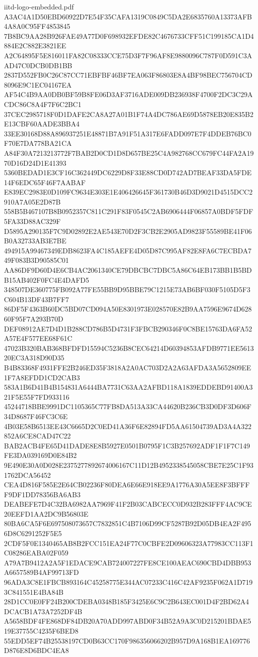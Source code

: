 \begin{filecontents*}[overwrite]{iitd-logo-embedded.pdf}
A3AC4A1D50EBD60922D7E54F35CAFA1319C0849C5DA2E6835760A13373AFB4A8A0C95FF4853845
7B8BC9AA28B926FAE49A77D0F698932EFDE82C4676733CFF51C199185CA1D4884E2C882E3821EE
A2C64895F5E816011FA82C08333CCE75D3F7F96AF8E9880096C787F0D591C3AAD47C0DCB0DB1BB
2837D552FB0C26C87CC71EBFBF46BF7EA063F86803E8A4BF98BEC756704CD8096E9C1EC04167EA
AF54C4B9AA0DB0BF59B8FE06D3AF3716ADE009DB236938F4700F2DC3C29ACDC86C8A4F7F6C2BC1
37CEC2985718F0D1DAFE2CA8A27A01B1F74A4DC786AE69D5878EB20E835B2E13CBF60AADE3BBA4
33EE30168D88A896937251E48871B7A91F51A317E6FADD097E7F4DDEB76BC0F70E7DA778BA21CA
A84F30A7213213772F7BAB2D0CD1D8D657BE25C4A982768CC679FC44FA2A1970D16D24D1E41393
5360BEDAD1E3CF16C362449DC6229D8F33E88CD0D742AD7BEAF33DA5FDE14F6EDC65F46F7AABAF
E839EC2983E0D109FC9634E303E1E406426645F361730B46D3D9021D4515DCC2910A7A05E2D87B
558B5B467107B8B0952357C811C291F83F0545C2AB6906444F06857A0BDF5FDF5FA33D88AC329F
D5895A290135F7C9D02892E2AE543E70D2F3CB2E2905AD9823F55589BE41F06B0A32733AB3E7BE
494915A99467349EDB8623FA4C185AEFE4D05D87C995AF82E8FA6C7ECBDA749F083B3D90585C01
AA86DF9D60D4E6CB4AC2061340CE79DBCBC7DBC5A86C64EB173BB1B5BDB15AB402F0FC4E4DAFD5
348507DE360775FB092A77FE55BB9D95BBE79C1215E73AB6BF030F5105D5F3C604B13DF43B7FF7
86DF5F4363B60DC5BD07CD094A50E8301973E028570E82B9AA7596E9674D62860F95F7A293B70D
DEF08912AE7D4D1B288CD786B5D4731F3FBCB290346F0C8BE15763DA6FA52A57E4F577EE68F61C
47023B320BAB368BFDFD15594C5236B8CEC64214D60394853AFDB9771EE561320EC3A318D90D35
B4B83368F4931FFE2B246ED35F3818A2A0AC703D2A2A63AFDA3A5652809EE1F7A8EFDD1CD2CAB3
583A1B6D41B4B154831A6444BA7731C63AA2AFBD118A1839EDDEBD91400A321F5E55F7FD933116
45244718BBE9991DC1105365C77FB8DA513A33CA44620B236CB3D0DF3D606F34D8687F46FC3C6E
4B03E58B6513EE43C6665D2C0ED41A36F6E82894FD5AA61504739AD3A4A322852A6CE8CAD47C22
BAB2ACB4FE65D41DADE8E8B5927E0501B0795F1C3B257692ADF1F1F7C149FE3DA039169D0E84B2
9E490E30A0D028E2375277892674006167C11D12B4952338545058CBE7E25C1F931762DCA56452
CEA4D816F585E2E64CB02236F80DEA6E66E918EE9A1776A30A5EE8F3BFFFF9DF1DD78356BA6AB3
DEABEFE7D4C32BA6982AA7969F41F2B03CABCECC0D932B283FFF4AC9CE20EEFD1AA2DC9B56803E
80BA6CA5F6E697508073657C7832851C4B7106D99CF5287B92D05DB4EA2F4956D8C6291252F5E5
2CDF5F0E1340465AB8B2FCC151EA24F77C0CBFE2D09606323A77983CC113F1C08286EABA02F059
A79A7B9412A2A5F1EDACE9CAB724007227FE8CE100AEAC690CBD4DBB953A6657589B4AF99713FD
96ADA3C8E1FBCB893164C45258775E344AC07233C416C42AF9235F062A1D7193C841551E4BA84B
28D1CC0E0FF24B200CDEBA0348B185F3425E6C9C2B643EC001D4F2BD62A4DCACB1A73A7252DF4B
A5658BDF4FE868DF84DB20A70ADD997ABD0F34B52A9A3C0D215201BDAE519E37755C4235F6BED8
55EDD5EF74B25538197CD0B63CC170F986356066202B957D9A168B1EA169776D876E8D6BDC4EA8

\end{filecontents*}
